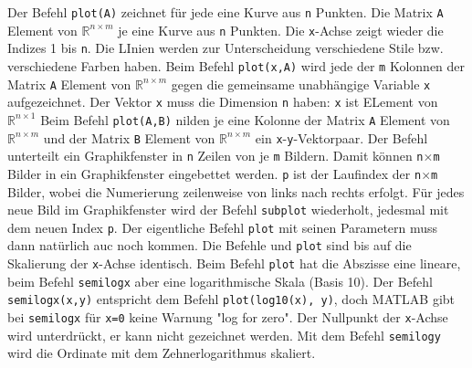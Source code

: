 \newline\newline
Der Befehl {\color{red}\texttt{plot(A)}} zeichnet für jede eine Kurve aus \texttt{n} Punkten. Die Matrix \texttt{A} Element von \texttt{$\mathbb{R}^{n\times m}$} je eine Kurve aus \texttt{n} Punkten. Die \texttt{x}-Achse zeigt wieder die Indizes 1 bis \texttt{n}. Die LInien werden zur Unterscheidung verschiedene Stile bzw. verschiedene Farben haben.
\newline\newline
Beim Befehl {\color{red}\texttt{plot(x,A)}} wird jede der \texttt{m} Kolonnen der Matrix \texttt{A} Element von \texttt{$\mathbb{R}^{n\times m}$} gegen die gemeinsame unabhängige Variable \texttt{x} aufgezeichnet. Der Vektor \texttt{x} muss die Dimension \texttt{n} haben: \texttt{x} ist ELement von \texttt{$\mathbb{R}^{n\times 1}$}
\newline\newline
Beim Befehl {\color{red}\texttt{plot(A,B)}} nilden je eine Kolonne der Matrix \texttt{A} Element von \texttt{$\mathbb{R}^{n\times m}$} und der Matrix \texttt{B} Element von \texttt{$\mathbb{R}^{n\times m}$} ein \texttt{x}-\texttt{y}-Vektorpaar. 
\newline\newline
Der Befehl  unterteilt ein Graphikfenster in \texttt{n} Zeilen von je \texttt{m} Bildern. Damit können \texttt{n$\times$m} Bilder in ein Graphikfenster eingebettet werden. \texttt{p} ist der Laufindex der \texttt{n$\times$m} Bilder, wobei die Numerierung zeilenweise von links nach rechts erfolgt. Für jedes neue Bild im Graphikfenster wird der Befehl \texttt{subplot} wiederholt, jedesmal mit dem neuen Index \texttt{p}. Der eigentliche Befehl \texttt{plot} mit seinen Parametern muss dann natürlich auc noch kommen. 
\newline\newline
Die Befehle  und {\color{red}\texttt{plot}} sind bis auf die Skalierung der \texttt{x}-Achse identisch. Beim Befehl {\color{red}\texttt{plot}} hat die Abszisse eine lineare, beim Befehl \texttt{semilogx} aber eine logarithmische Skala (Basis 10). Der Befehl {\color{red}\texttt{semilogx(x,y)}} entspricht dem Befehl {\color{red}\texttt{plot(log10(x), y)}}, doch MATLAB gibt bei \texttt{semilogx} für \texttt{x=0} keine Warnung "log for zero". Der Nullpunkt der \texttt{x}-Achse wird unterdrückt, er kann nicht gezeichnet werden. Mit dem Befehl {\color{red}\texttt{semilogy}} wird die Ordinate mit dem Zehnerlogarithmus skaliert.    
